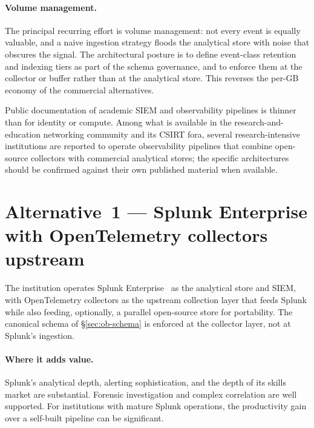 \paragraph{Volume management.} The principal recurring effort is
volume management: not every event is equally valuable, and a
naive ingestion strategy floods the analytical store with noise
that obscures the signal. The architectural posture is to define
event-class retention and indexing tiers as part of the schema
governance, and to enforce them at the collector or buffer rather
than at the analytical store. This reverses the per-GB economy of
the commercial alternatives.

\begin{realworldbox}
\noindent Public documentation of academic SIEM and observability
pipelines is thinner than for identity or compute. Among what is
available in the research-and-education networking community and its
CSIRT fora, several research-intensive
institutions are reported to operate observability pipelines that
combine open-source collectors with commercial analytical stores;
the specific architectures should be confirmed against their own
published material when available.
\end{realworldbox}

\section{Alternative~1 --- Splunk Enterprise with OpenTelemetry collectors upstream}
\label{sec:ob-alt1}

\begin{alternativebox}
\noindent The institution operates Splunk Enterprise~\cite{splunk} as the
analytical store and SIEM, with OpenTelemetry collectors as the
upstream collection layer that feeds Splunk while also feeding,
optionally, a parallel open-source store for portability. The
canonical schema of \S\ref{sec:ob-schema} is enforced at the
collector layer, not at Splunk's ingestion.
\end{alternativebox}

\paragraph{Where it adds value.} Splunk's analytical depth, alerting
sophistication, and the depth of its skills market are substantial.
Forensic investigation and complex correlation are well supported.
For institutions with mature Splunk operations, the productivity
gain over a self-built pipeline can be significant.

